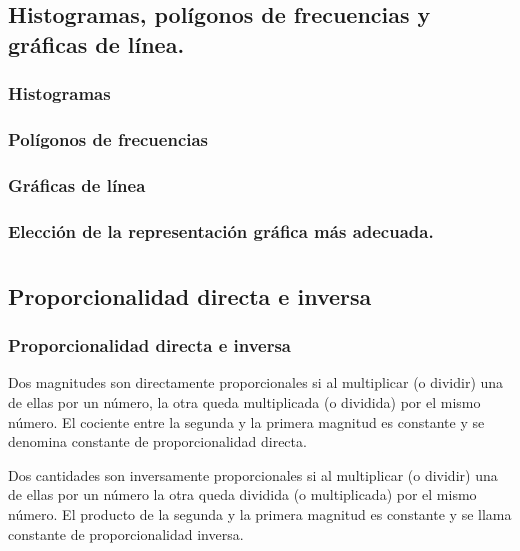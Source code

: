 \documentclass[11pt]{book}
\begin{document}
\section{Histogramas, polígonos de frecuencias y gráficas de línea.}
\subsection{Histogramas}
\subsection{Polígonos de frecuencias}
\subsection{Gráficas de línea}
\subsection{Elección de la representación gráfica más adecuada.}

\chapter{}

\section{Proporcionalidad directa e inversa}
\subsection{Proporcionalidad directa e inversa}
Dos magnitudes son directamente proporcionales si al multiplicar (o dividir) una de ellas por un número, la otra queda multiplicada (o dividida) por el mismo número. El cociente entre la segunda y la primera magnitud es constante y se denomina constante de proporcionalidad directa.

Dos cantidades son inversamente proporcionales si al multiplicar (o dividir) una de ellas por un número la otra queda dividida (o multiplicada) por el mismo número. El producto de la segunda y la primera magnitud es constante y se llama constante de proporcionalidad inversa.
\end{document}
